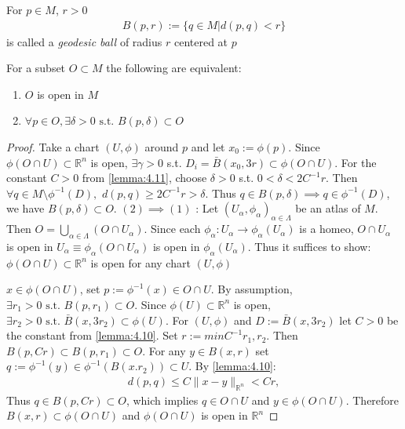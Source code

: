 \begin{definition}
    For $p\in M$, $r>0$
    \[
    \begin{aligned}
        B(p,r) := \{q \in M | d(p,q) < r\}
    \end{aligned}
    \]
    is called a \emph{geodesic ball} of radius $r$ centered at $p$
\end{definition}

\begin{proposition}\label{prop:open_in_manifold}
    For a subset $O \subset M$ the following are equivalent:
    \begin{enumerate}
        \item $O$ is open in $M$
        \item $\forall p \in O, \exists \delta > 0 \text{ s.t. } B(p, \delta) \subset O$
    \end{enumerate}
\end{proposition}

\begin{proof}
    Take a chart $(U, \phi)$ around $p$ and let $x_0 := \phi(p)$. Since $\phi(O \cap U) \subset \mathbb{R}^n$ is open,
    $\exists \gamma > 0$ s.t. $D_i = \bar{B}(x_0, 3r) \subset \phi(O \cap U)$. For the constant $C>0$ from \autoref{lemma:4.11}, choose $\delta >0$ s.t.
    $0 < \delta < 2 C^{-1}r$. Then $\forall q \in M \setminus \phi^{-1}(D),$
    $d(p,q) \geq 2C^{-1}r > \delta$. Thus $q \in B(p, \delta) \implies q \in \phi^{-1}(D)$,
    we have $B(p,\delta) \subset O$.
    $(2) \implies (1)$ : Let ${(U_{\alpha}, \phi_{\alpha})}_{\alpha \in \Lambda}$ be an atlas of $M$. Then $O = \bigcup_{\alpha \in \Lambda} (O \cap U_{\alpha})$.
    Since each $\phi_{\alpha} : U_{\alpha} \to \phi_{\alpha} (U_{\alpha})$ is a homeo,
    $O \cap U_{\alpha}$ is open in $U_{\alpha} \equiv \phi_{\alpha} (O \cap U_{\alpha})$ is open in $\phi_{\alpha}(U_{\alpha})$.
    Thus it suffices to show: $\phi (O \cap U) \subset \mathbb{R}^n $ is open for any chart $(U, \phi)$

    $x \in \phi(O \cap U)$, set $p := \phi^{-1}(x) \in O \cap U$. By assumption, $\exists r_1 >0 \text{ s.t. } B(p, r_1) \subset O$.
    Since $\phi (U) \subset \mathbb{R}^n$ is open, $\exists r_2>0 \text{ s.t. } \bar{B}(x, 3 r_2) \subset \phi(U)$.
    For $(U, \phi)$ and $D := \bar{B}(x, 3 r_2)$ let $C>0$ be the constant from \autoref{lemma:4.10}. Set $r:= min{C^{-1}r_1, r_2}$.
    Then $B(p, C r) \subset B(p, r_1) \subset O$. For any $y \in B(x, r)$ set $q := \phi^{-1}(y) \in \phi^{-1}(B(x. r_2)) \subset U$. By \autoref{lemma:4.10}:
    \[
    \begin{aligned}
        d(p,q) \leq C \| x-y \|_{\mathbb{R}^n} < C r,
    \end{aligned}
    \]
    Thus $q \in B(p, Cr) \subset O$, which implies $q \in O \cap U$ and $y \in \phi(O \cap U)$. Therefore $B(x,r) \subset \phi(O \cap U)$ and $\phi(O \cap U)$ is open in $\mathbb{R}^n$
\end{proof}


